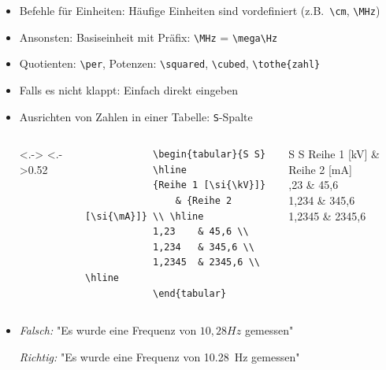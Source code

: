 \begin{frame}[<+->][fragile]
	\begin{itemize}
		\item Befehle für Einheiten: Häufige Einheiten sind vordefiniert (z.B.\ \lstinline!\cm!, \lstinline!\MHz!)
		\item Ansonsten: Basiseinheit mit Präfix: \lstinline!\MHz! = \lstinline!\mega\Hz!
		\item Quotienten: \lstinline!\per!, Potenzen: \lstinline!\squared!, \lstinline!\cubed!, \lstinline!\tothe{zahl}!
		\item Falls es nicht klappt: Einfach direkt eingeben
		\item Ausrichten von Zahlen in einer Tabelle: \lstinline!S!-Spalte
		\begin{columns}<.->
			\lstset{basicstyle=\footnotesize\ttfamily}
			\hspace{0.5cm}
			\column<.->{0.52\textwidth}
			\begin{lstlisting}
			\begin{tabular}{S S}
			\hline
			{Reihe 1 [\si{\kV}]}
			    & {Reihe 2 [\si{\mA}]} \\ \hline
			1,23	& 45,6 \\
			1,234	& 345,6 \\
			1,2345	& 2345,6 \\ \hline
			\end{tabular}
			\end{lstlisting}
			\rmfamily
			\begin{tabular}{S S}
			\hline
			{Reihe 1 [\si{\kV}]}
			    & {Reihe 2 [\si{\mA}]} \\ ,23	& 45,6 \\
			1,234	& 345,6 \\
			1,2345	& 2345,6 \\ \hline
			\end{tabular}
		\end{columns}
		\item \emph{Falsch:} "{\rmfamily Es wurde eine Frequenz von $10,28 Hz$ gemessen}"
		
		\emph{Richtig:} "{\rmfamily Es wurde eine Frequenz von \SI[detect-family=true]{10,28}{Hz} gemessen}"
	\end{itemize}
\end{frame}

